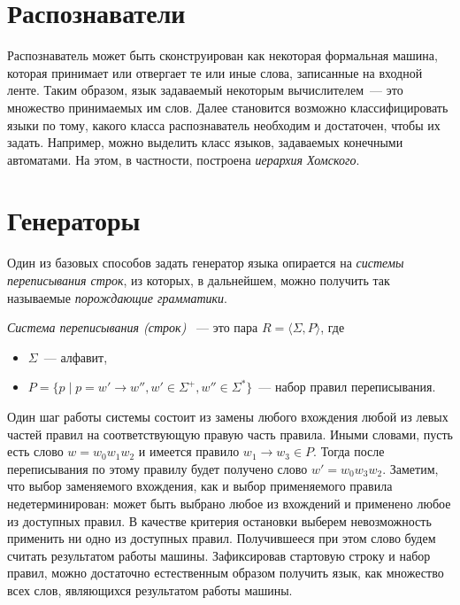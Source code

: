 \section{Распознаватели}

Распознаватель может быть сконструирован как некоторая формальная машина, которая принимает или отвергает те или иные слова, записанные на входной ленте.
Таким образом, язык задаваемый некоторым вычислителем~--- это множество принимаемых им слов.
Далее становится возможно классифицировать языки по тому, какого класса распознаватель необходим и достаточен, чтобы их задать.
Например, можно выделить класс языков, задаваемых конечными автоматами.
На этом, в частности, построена \emph{иерархия Хомского}.

\section{Генераторы}

Один из базовых способов задать генератор языка опирается на \emph{системы переписывания строк}, из которых, в дальнейшем, можно получить так называемые \emph{порождающие грамматики}.

\begin{definition}
    \emph{Система переписывания (строк)}%
    ~---
    это пара $R = \langle \Sigma, P  \rangle$, где 
    \begin{itemize}
        \item $\Sigma$~--- алфавит, 
        \item $P= \{p \mid p = w' \to w'', w' \in \Sigma^+, w'' \in \Sigma^*\}$~--- набор правил переписывания.
    \end{itemize}
\end{definition}

Один шаг работы системы состоит из замены любого вхождения любой из левых частей правил на соответствующую правую часть правила.
Иными словами, пусть есть слово $w = w_0 w_1 w_2$ и имеется правило $w_1 \to w_3 \in P$.
Тогда после переписывания по этому правилу будет получено слово $w' = w_0 w_3 w_2$.
Заметим, что выбор заменяемого вхождения, как и выбор применяемого правила недетерминирован: может быть выбрано любое из вхождений и применено любое из доступных правил.
В качестве критерия остановки выберем невозможность применить ни одно из доступных правил.
Получившееся при этом слово будем считать результатом работы машины.
Зафиксировав стартовую строку и набор правил, можно достаточно естественным образом получить язык, как множество всех слов, являющихся результатом работы машины.

